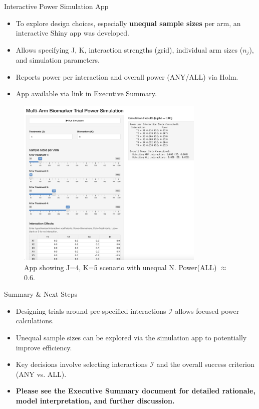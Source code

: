\documentclass{beamer}
\begin{document}
\begin{frame}{Interactive Power Simulation App}
  \begin{itemize}
      \item To explore design choices, especially \textbf{unequal sample sizes} per arm, an interactive Shiny app was developed. \pause
      \item Allows specifying J, K, interaction strengths (grid), individual arm sizes ($n_j$), and simulation parameters. \pause
      \item Reports power per interaction and overall power (ANY/ALL) via Holm. \pause
      \item App available via link in Executive Summary. %
  \end{itemize}
  \vfill %
  \begin{figure}
      \centering
      \includegraphics[width=0.8\textwidth]{figs/app.png}
      \caption{App showing J=4, K=5 scenario with unequal N. Power(ALL) $\approx$ 0.6.}
  \end{figure} 
\end{frame}

\begin{frame}{Summary \& Next Steps} %
    \begin{itemize}
        \item Designing trials around pre-specified interactions $\mathcal{I}$ allows focused power calculations. \pause
        \item Unequal sample sizes can be explored via the simulation app to potentially improve efficiency. \pause
        \item Key decisions involve selecting interactions $\mathcal{I}$ and the overall success criterion (ANY vs. ALL). \pause
        \item \textbf{Please see the Executive Summary document for detailed rationale, model interpretation, and further discussion.}
    \end{itemize}
\end{frame}
\end{document}
